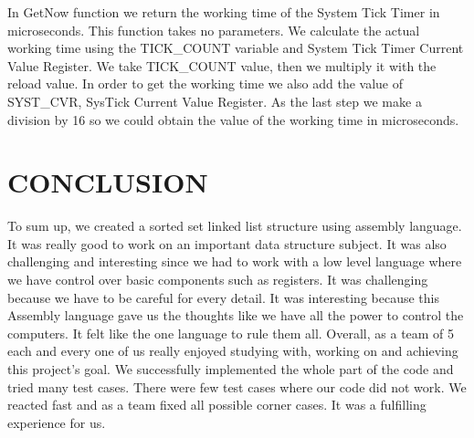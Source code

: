 \documentclass[pdftex,12pt,a4paper]{article}
\begin{document}
In GetNow function we return the working time of the System Tick Timer in microseconds. This function takes no parameters. We calculate the actual working time using the TICK\_COUNT variable and System Tick Timer Current Value Register. We take TICK\_COUNT value, then we multiply it with the reload value. In order to get the working time we also add the value of SYST\_CVR, SysTick Current Value Register. As the last step we make a division by 16 so we could obtain the value of the working time in microseconds. \\




\section{CONCLUSION}
To sum up, we created a sorted set linked list structure using assembly language. It was really good to work on an important data structure subject. It was also challenging and interesting since we had to work with a low level language where we have control over basic components such as registers. It was challenging because we have to be careful for every detail. It was interesting because this Assembly language gave us the thoughts like we have all the power to control the computers. It felt like the one language to rule them all. Overall, as a team of 5 each and every one of us really enjoyed studying with, working on and achieving this project's goal. We successfully implemented the whole part of the code and tried many test cases. There were few test cases where our code did not work. We reacted fast and as a team fixed all possible corner cases. It was a fulfilling experience for us.\\











\newpage
{}



\end{document}
